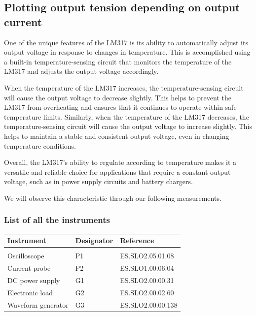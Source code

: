 \subsection{Plotting output tension depending on output current} \label{ssec:num12}
{
One of the unique features of the LM317 is its ability to automatically adjust its output voltage in response to changes in temperature. This is accomplished using a built-in temperature-sensing circuit that monitors the temperature of the LM317 and adjusts the output voltage accordingly.\vspace{+12pt}

When the temperature of the LM317 increases, the temperature-sensing circuit will cause the output voltage to decrease slightly. This helps to prevent the LM317 from overheating and ensures that it continues to operate within safe temperature limits. Similarly, when the temperature of the LM317 decreases, the temperature-sensing circuit will cause the output voltage to increase slightly. This helps to maintain a stable and consistent output voltage, even in changing temperature conditions.\vspace{+12pt}

Overall, the LM317's ability to regulate according to temperature makes it a versatile and reliable choice for applications that require a constant output voltage, such as in power supply circuits and battery chargers. \vspace{+12pt}

We will observe this characteristic through our following measurements.

\subsubsection{List of all the instruments}

\begin{tabular}{l | l | l}
	Instrument & Designator & Reference \\ 
	\hline\hline & & \vspace{-8pt}\\ 
	Oscilloscope & P1 & ES.SLO2.05.01.08 \\
	Current probe & P2 & ES.SLO1.00.06.04 \\
	DC power supply & G1 & ES.SLO2.00.00.31 \\
	Electronic load & G2 & ES.SLO2.00.02.60 \\
	Waveform generator & G3 & ES.SLO2.00.00.138 
\end{tabular}

}

